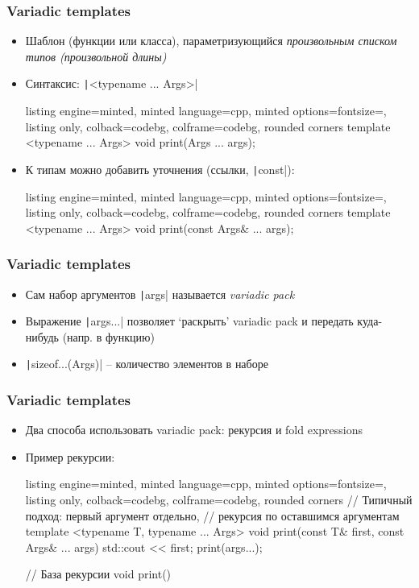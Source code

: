 \documentclass[10pt]{beamer}
\begin{document}
\begin{frame}[fragile]
\frametitle{Variadic templates}
\begin{itemize}
\item Шаблон (функции или класса), параметризующийся \textit{произвольным списком типов (произвольной длины)}
\pause
\item Синтаксис: \texttt|<typename ... Args>|
\pause
{}
\begin{tcblisting}{listing engine=minted, minted language=cpp, minted options={fontsize=\scriptsize}, listing only, colback=codebg, colframe=codebg, rounded corners}
template <typename ... Args>
void print(Args ... args);
\end{tcblisting}
\pause
{}
\item К типам можно добавить уточнения (ссылки, \texttt|const|):
\begin{tcblisting}{listing engine=minted, minted language=cpp, minted options={fontsize=\scriptsize}, listing only, colback=codebg, colframe=codebg, rounded corners}
template <typename ... Args>
void print(const Args& ... args);
\end{tcblisting}
\end{itemize}
\end{frame}

\begin{frame}[fragile]
\frametitle{Variadic templates}
\begin{itemize}
\item Сам набор аргументов \texttt|args| называется \textit{variadic pack}
\pause
\item Выражение \texttt|args...| позволяет `раскрыть' variadic pack и передать куда-нибудь (напр. в функцию)
\pause
\item \texttt|sizeof...(Args)| -- количество элементов в наборе
\end{itemize}
\end{frame}

\begin{frame}[fragile]
\frametitle{Variadic templates}
\begin{itemize}
\item Два способа использовать variadic pack: рекурсия и fold expressions
\pause
\item Пример рекурсии:
\begin{tcblisting}{listing engine=minted, minted language=cpp, minted options={fontsize=\scriptsize}, listing only, colback=codebg, colframe=codebg, rounded corners}
// Типичный подход: первый аргумент отдельно,
// рекурсия по оставшимся аргументам
template <typename T, typename ... Args>
void print(const T& first, const Args& ... args) {
  std::cout << first;
  print(args...);
}

// База рекурсии
void print() {}
\end{tcblisting}
\end{itemize}
\end{frame}
\end{document}
